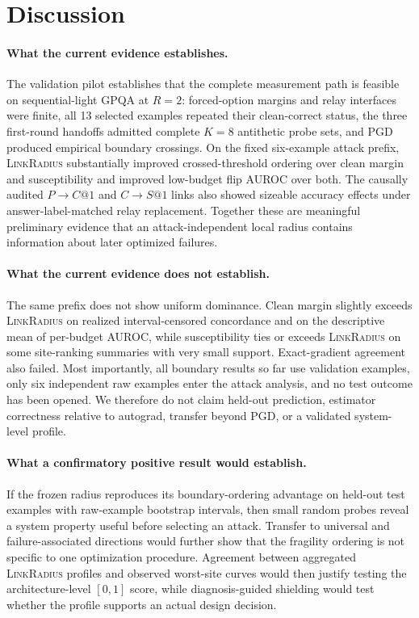 \documentclass[11pt]{article}
\newcommand{\method}{\textsc{LinkRadius}}
\begin{document}
\section{Discussion}

\paragraph{What the current evidence establishes.}
The validation pilot establishes that the complete measurement path is
feasible on sequential-light GPQA at $R=2$: forced-option margins and relay
interfaces were finite, all 13 selected examples repeated their clean-correct
status, the three first-round handoffs admitted complete $K=8$ antithetic probe
sets, and PGD produced empirical boundary crossings. On the fixed six-example
attack prefix, \method{} substantially improved crossed-threshold ordering over
clean margin and susceptibility and improved low-budget flip AUROC over both.
The causally audited $P{\to}C@1$ and $C{\to}S@1$ links also showed sizeable
accuracy effects under answer-label-matched relay replacement. Together these
are meaningful preliminary evidence that an attack-independent local radius
contains information about later optimized failures.

\paragraph{What the current evidence does not establish.}
The same prefix does not show uniform dominance. Clean margin slightly exceeds
\method{} on realized interval-censored concordance and on the descriptive
mean of per-budget AUROC, while susceptibility ties or exceeds \method{} on
some site-ranking summaries with very small support. Exact-gradient agreement
also failed. Most importantly, all boundary results so far use validation
examples, only six independent raw examples enter the attack analysis, and no
test outcome has been opened. We therefore do not claim held-out prediction,
estimator correctness relative to autograd, transfer beyond PGD, or a validated
system-level profile.

\paragraph{What a confirmatory positive result would establish.}
If the frozen radius reproduces its boundary-ordering advantage on held-out
test examples with raw-example bootstrap intervals, then small random probes
reveal a system property useful before selecting an attack. Transfer to
universal and failure-associated directions would further show that the
fragility ordering is not specific to one optimization procedure. Agreement
between aggregated \method{} profiles and observed worst-site curves would
then justify testing the architecture-level \([0,1]\) score, while
diagnosis-guided shielding would test whether the profile supports an actual
design decision.
\end{document}
